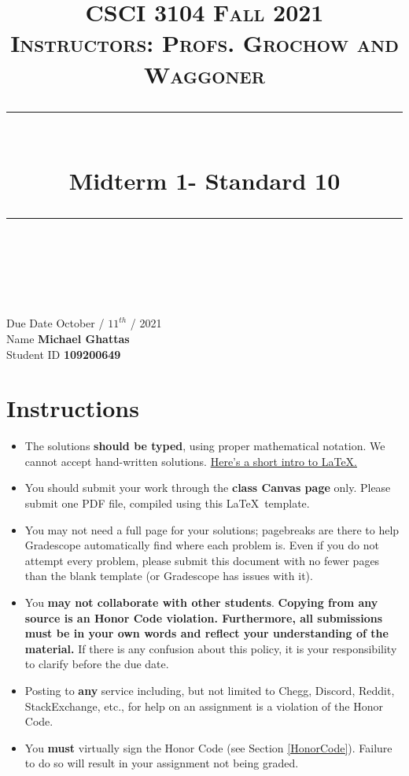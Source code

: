 \documentclass[11pt]{article}
\title{
\normalfont \normalsize 
\textsc{CSCI 3104 Fall 2021 \\ 
Instructors: Profs. Grochow and Waggoner} \\
[10pt] 
\rule{\linewidth}{0.5pt} \\[6pt] 
\huge Midterm 1- Standard 10 \\
\rule{\linewidth}{2pt}  \\[10pt]
}
\date{}
\theoremstyle{definition}
\theoremstyle{definition}
\theoremstyle{definition}
\begin{document}

\maketitle


\noindent
Due Date \dotfill October / $11^{th}$ / 2021 \\
Name \dotfill \textbf{Michael Ghattas} \\
Student ID \dotfill \textbf{109200649} \\


\tableofcontents

\section{Instructions}
 \begin{itemize}
	\item The solutions \textbf{should be typed}, using proper mathematical notation. We cannot accept hand-written solutions. \href{http://ece.uprm.edu/~caceros/latex/introduction.pdf}{Here's a short intro to \LaTeX.}
	\item You should submit your work through the \textbf{class Canvas page} only. Please submit one PDF file, compiled using this \LaTeX \ template.
	\item You may not need a full page for your solutions; pagebreaks are there to help Gradescope automatically find where each problem is. Even if you do not attempt every problem, please submit this document with no fewer pages than the blank template (or Gradescope has issues with it).

	\item You \textbf{may not collaborate with other students}. \textbf{Copying from any source is an Honor Code violation. Furthermore, all submissions must be in your own words and reflect your understanding of the material.} If there is any confusion about this policy, it is your responsibility to clarify before the due date. 

	\item Posting to \textbf{any} service including, but not limited to Chegg, Discord, Reddit, StackExchange, etc., for help on an assignment is a violation of the Honor Code.

	\item You \textbf{must} virtually sign the Honor Code (see Section \ref{HonorCode}). Failure to do so will result in your assignment not being graded.
\end{itemize}
\end{document}
